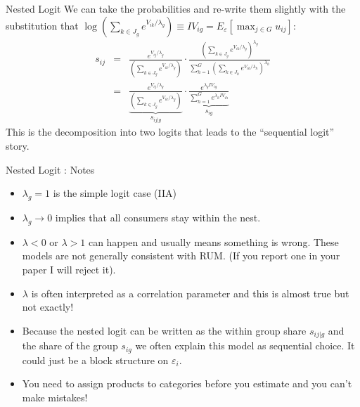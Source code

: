\documentclass[aspectratio=169,11pt]{beamer}
\begin{document}
\begin{frame}{Nested Logit}
We can take the probabilities and re-write them slightly with the substitution that
$\log \left(\sum_{k \in J_g} e^{V_{ik}/ \lambda_g} \right)\equiv IV_{ig}=E_{\varepsilon}[\max_{j \in G} u_{ij}]$:
\begin{eqnarray*}
s_{ij} &=& \frac{ e^{V_{ij}/\lambda_g}}{ \left(\sum_{k \in J_g} e^{V_{ik}/\lambda_g} \right)}
\cdot
\frac{ \left(\sum_{k \in J_g} e^{V_{ik}/\lambda_g} \right)^{\lambda_g}}{\sum_{h=1}^G \left(\sum_{k \in J_h} e^{V_{ik}/\lambda_h} \right)^{\lambda_h}} \\
&=& \underbrace{\frac{ e^{V_{ij}/\lambda_g}}{ \left(\sum_{k \in J_g} e^{V_{ik}/\lambda_g} \right)}}_{s_{i j | g}}
\cdot
\underbrace{\frac{e^{\lambda_g IV_{ig}}}{\sum_{h=1}^{G} e^{\lambda_h IV_{ih}} }}_{s_{ig}}
\end{eqnarray*}
This is the decomposition into two logits that leads to the ``sequential logit'' story.
\end{frame}



\begin{frame}{Nested Logit : Notes}
\begin{itemize}
\item $\lambda_g=1$ is the simple logit case (IIA)
\item $\lambda_g \rightarrow 0$ implies that all consumers stay within the nest.
\item $\lambda < 0$ or $\lambda > 1$ can happen and usually means something is wrong. These models are not generally consistent with RUM. (If you report one in your paper I will reject it).
\item $\lambda$ is often interpreted as a correlation parameter and this is almost true but not exactly!
\item Because the nested logit can be written as the within group share $s_{ij|g}$ and the share of the group $s_{ig}$ we often explain this model as \alert{sequential choice}. It could just be a \alert{block structure} on $\varepsilon_i$.
\item You need to assign products to categories \alert{before you estimate} and you can't make mistakes!
\end{itemize}
\end{frame}
\end{document}

